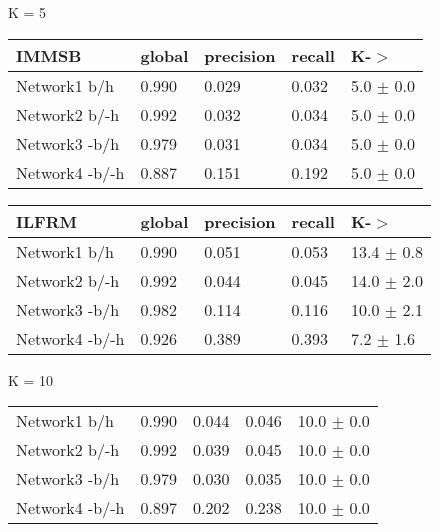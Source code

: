 

\begin{table*}[h] \label{table:unbalanced}
\caption{Predictive Performance on a UnBalanced Testing set}
	\begin{minipage}[h]{0.45\linewidth} 
K = 5\hspace{5pt}
\begin{tabular}{lllll}
\hline
 IMMSB   &   global &   precision &   recall &    K-\ensuremath{>} \\
\hline
 Network1 b/h         &    0.990 &       0.029 &    0.032 & 5.0 $\pm$ 0.0 \\
 Network2 b/-h       &    0.992 &       0.032 &    0.034 & 5.0 $\pm$ 0.0 \\
 Network3 -b/h       &    0.979 &       0.031 &    0.034 & 5.0 $\pm$ 0.0 \\
 Network4 -b/-h       &    0.887 &       0.151 &    0.192 & 5.0 $\pm$ 0.0 \\

\hline
\end{tabular}
\end{minipage}
\hspace{0.8cm}
\begin{minipage}[h]{0.45\linewidth}
\begin{tabular}{lllll}
\hline
  ILFRM & global &   precision &   recall &     K-\ensuremath{>} \\
\hline
 Network1 b/h       &    0.990 &       0.051 &    0.053 & 13.4 $\pm$ 0.8    \\
 Network2 b/-h     &    0.992 &       0.044 &    0.045 & 14.0 $\pm$ 2.0    \\
 Network3 -b/h     &    0.982 &       0.114 &    0.116 & 10.0 $\pm$ 2.1 \\
 Network4 -b/-h     &    0.926 &       0.389 &    0.393 & 7.2 $\pm$ 1.6     \\

\hline
\end{tabular}
\end{minipage}


	\begin{minipage}[h]{0.45\linewidth} 
K = 10
\begin{tabular}{lllll}
Network1 b/h         &    0.990 &       0.044 &    0.046 & 10.0 $\pm$ 0.0 \\
 Network2 b/-h       &    0.992 &       0.039 &    0.045 & 10.0 $\pm$ 0.0 \\
 Network3 -b/h       &    0.979 &       0.030 &    0.035 & 10.0 $\pm$ 0.0 \\
 Network4 -b/-h       &    0.897 &       0.202 &    0.238 & 10.0 $\pm$ 0.0 \\


\end{tabular}
\end{minipage}
\end{table*}
